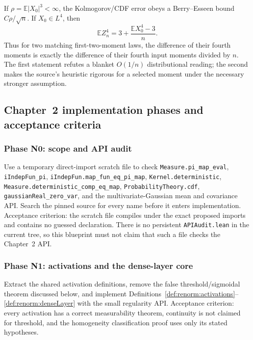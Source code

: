 \begin{theorem}
\label{thm:renorm:initUniversalityRates}
If $\rho=\mathbb E|X_0|^3<\infty$, the Kolmogorov/CDF error obeys a Berry--Esseen bound
$C\rho/\sqrt n$.  If $X_0\in L^4$, then
\[
  \mathbb E Z_n^4=3+\frac{\mathbb E X_0^4-3}{n}.
\]
Thus for two matching first-two-moment laws, the difference of their fourth moments is exactly the
difference of their fourth input moments divided by $n$.  The first statement refutes a blanket
$O(1/n)$ distributional reading; the second makes the source's heuristic rigorous for a selected
moment under the necessary stronger assumption.
\end{theorem}

\subsection{Chapter~2 implementation phases and acceptance criteria}

\subsubsection*{Phase N0: scope and API audit}
Use a temporary direct-import scratch file to check
\texttt{Measure.pi\_map\_eval}, \texttt{iIndepFun\_pi},
\texttt{iIndepFun.map\_fun\_eq\_pi\_map}, \texttt{Kernel.deterministic},
\texttt{Measure.deterministic\_comp\_eq\_map}, \texttt{ProbabilityTheory.cdf},
\texttt{gaussianReal\_zero\_var}, and the multivariate-Gaussian mean and covariance API.  Search the
pinned source for every name before it enters implementation.  Acceptance criterion: the scratch
file compiles under the exact proposed imports and contains no guessed declaration.  There is no
persistent \texttt{APIAudit.lean} in the current tree, so this blueprint must not claim that such a
file checks the Chapter~2 API.

\subsubsection*{Phase N1: activations and the dense-layer core}
Extract the shared activation definitions, remove the false threshold/sigmoidal theorem discussed
below, and implement Definitions~\ref{def:renorm:activations}--\ref{def:renorm:denseLayer} with the
small regularity API.  Acceptance criterion: every activation has a correct measurability theorem,
continuity is not claimed for threshold, and the homogeneity classification proof uses only its
stated hypotheses.

